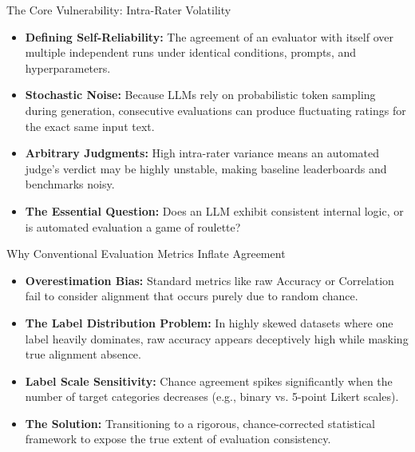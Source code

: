 \documentclass[10pt]{beamer}
\begin{document}
\begin{frame}{The Core Vulnerability: Intra-Rater Volatility}
  \begin{itemize}
    \item \textbf{Defining Self-Reliability:} The agreement of an evaluator with itself over multiple independent runs under identical conditions, prompts, and hyperparameters.
    \item \textbf{Stochastic Noise:} Because LLMs rely on probabilistic token sampling during generation, consecutive evaluations can produce fluctuating ratings for the exact same input text.
    \item \textbf{Arbitrary Judgments:} High intra-rater variance means an automated judge's verdict may be highly unstable, making baseline leaderboards and benchmarks noisy.
    \item \textbf{The Essential Question:} Does an LLM exhibit consistent internal logic, or is automated evaluation a game of roulette?
  \end{itemize}
\end{frame}

\begin{frame}{Why Conventional Evaluation Metrics Inflate Agreement}
  \begin{itemize}
    \item \textbf{Overestimation Bias:} Standard metrics like raw Accuracy or Correlation fail to consider alignment that occurs purely due to random chance.
    \item \textbf{The Label Distribution Problem:} In highly skewed datasets where one label heavily dominates, raw accuracy appears deceptively high while masking true alignment absence.
    \item \textbf{Label Scale Sensitivity:} Chance agreement spikes significantly when the number of target categories decreases (e.g., binary vs. 5-point Likert scales).
    \item \textbf{The Solution:} Transitioning to a rigorous, chance-corrected statistical framework to expose the true extent of evaluation consistency.
  \end{itemize}
\end{frame}
\end{document}
